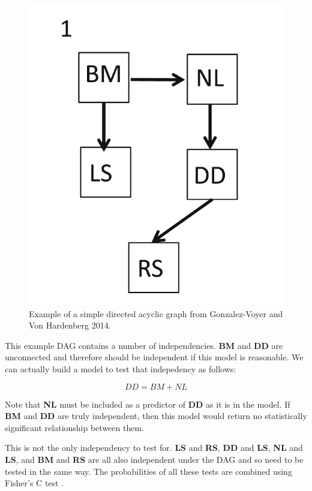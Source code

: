 \documentclass[
]{book}
\begin{document}
\begin{figure}[H]

{\centering \includegraphics[width=7.94in]{Images/DAG1} 

}

\caption{Example of a simple directed acyclic graph from Gonzalez-Voyer and Von Hardenberg 2014.}\label{fig:unnamed-chunk-287}
\end{figure}

This example DAG contains a number of independencies. \textbf{BM} and \textbf{DD} are unconnected and therefore should be independent if this model is reasonable. We can actually build a model to test that indepedency as follows:

\[ DD = BM + NL\]

Note that \textbf{NL} must be included as a predictor of \textbf{DD} as it is in the model. If \textbf{BM} and \textbf{DD} are truly independent, then this model would return no statistically significant relationship between them.

This is not the only independency to test for. \textbf{LS} and \textbf{RS}, \textbf{DD} and \textbf{LS}, \textbf{NL} and \textbf{LS}, and \textbf{BM} and \textbf{RS} are all also independent under the DAG and so need to be tested in the same way. The probabilities of all these tests are combined using Fisher's C test \citep{Shipley16}.
\end{document}
